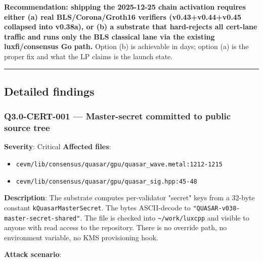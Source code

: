 \documentclass[
]{article}
\providecommand{\tightlist}{%
  \setlength{\itemsep}{0pt}\setlength{\parskip}{0pt}}
\begin{document}
\textbf{Recommendation: shipping the 2025-12-25 chain activation
requires either (a) real BLS/Corona/Groth16 verifiers
(v0.43+v0.44+v0.45 collapsed into v0.38a), or (b) a substrate that
hard-rejects all cert-lane traffic and runs only the BLS classical lane
via the existing luxfi/consensus Go path.} Option (b) is achievable in
days; option (a) is the proper fix and what the LP claims is the launch
state.

\begin{center}\rule{0.5\linewidth}{0.5pt}\end{center}

\subsection{Detailed findings}\label{detailed-findings}

\subsubsection{Q3.0-CERT-001 --- Master-secret committed to public
source
tree}\label{q30-cert-001--master-secret-committed-to-public-source-tree}

\textbf{Severity}: Critical \textbf{Affected files}:

\begin{itemize}
\tightlist
\item
  \texttt{cevm/lib/consensus/quasar/gpu/quasar\_wave.metal:1212-1215}
\item
  \texttt{cevm/lib/consensus/quasar/gpu/quasar\_sig.hpp:45-48}
\end{itemize}

\textbf{Description}: The substrate computes per-validator "secret" keys
from a 32-byte constant \texttt{kQuasarMasterSecret}. The bytes
ASCII-decode to \texttt{"QUASAR-v038-master-secret-shared"}. The file is
checked into \texttt{\textasciitilde{}/work/luxcpp} and visible to
anyone with read access to the repository. There is no override path, no
environment variable, no KMS provisioning hook.

\textbf{Attack scenario}:
\end{document}

